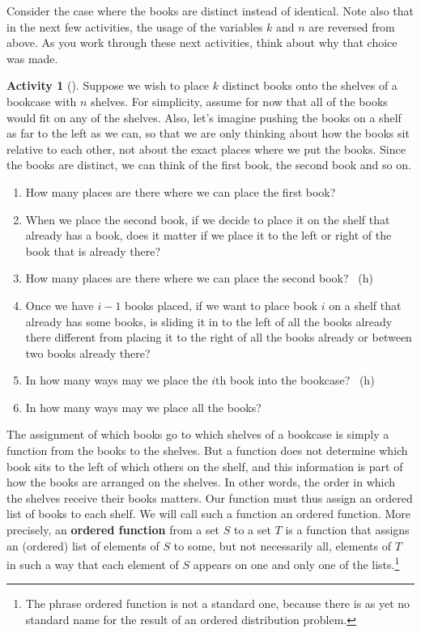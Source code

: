 \documentclass[10pt,]{book}
\newcommand{\terminology}[1]{\textbf{#1}}
\theoremstyle{plain}
\theoremstyle{definition}
\theoremstyle{definition}
\theoremstyle{definition}
\newtheorem{activity}[project]{Activity}
\numberwithin{equation}{chapter}
\begin{document}
\hypertarget{p-824}{}%
Consider the case where the books are distinct instead of identical.  Note also that in the next few activities, the usage of the variables \(k\) and \(n\) are reversed from above.  As you work through these next activities, think about why that choice was made.%
\begin{activity}[]\label{bookcase}
\hypertarget{p-825}{}%
Suppose we wish to place \(k\) distinct books onto the shelves of a bookcase with \(n\) shelves. For simplicity, assume for now that all of the books would fit on any of the shelves. Also, let's imagine pushing the books on a shelf as far to the left as we can, so that we are only thinking about how the books sit relative to each other, not about the exact places where we put the books. Since the books are distinct, we can think of the first book, the second book and so on.%
\begin{enumerate}[font=\bfseries,label=(\alph*),ref=\alph*]
\item\label{task-161} \hypertarget{p-826}{}%
How many places are there where we can place the first book?%
\item\label{task-162} \hypertarget{p-828}{}%
When we place the second book, if we decide to place it on the shelf that already has a book, does it matter if we place it to the left or right of the book that is already there?%
\item\label{task-163} \hypertarget{p-830}{}%
How many places are there where we can place the second book?%
~{\tiny (h)}\item\label{task-164} \hypertarget{p-833}{}%
Once we have \(i-1\) books placed, if we want to place book \(i\)  on a shelf that already has some books, is sliding it in to the left of all the books already there different from placing it to the right of all the books already or between two books already there?%
\item\label{task-165} \hypertarget{p-835}{}%
In how many ways may we place the \(i\)th book into the bookcase?%
~{\tiny (h)}\item\label{task-166} \hypertarget{p-838}{}%
In how many ways may we place all the books?%
\end{enumerate}
\end{activity}
\hypertarget{p-840}{}%
The assignment of which books go to which shelves of a bookcase is simply a function from the books to the shelves. But a function does not determine which book sits to the left of which others on the shelf, and this information is part of how the books are arranged on the shelves. In other words, the order in which the shelves receive their books matters.  Our function must thus assign an ordered list of books to each shelf. We will call such a function an ordered function. More precisely, an \terminology{ordered function} from a set \(S\) to a set \(T\) is a function that assigns an (ordered) list of elements of \(S\) to some, but not necessarily all, elements of \(T\) in such a way that each element of \(S\) appears on one and only one of the lists.\footnote{The phrase ordered function is not a standard one, because there is as yet no standard name for the result of an ordered distribution problem.\label{fn-10}}%
\end{document}
